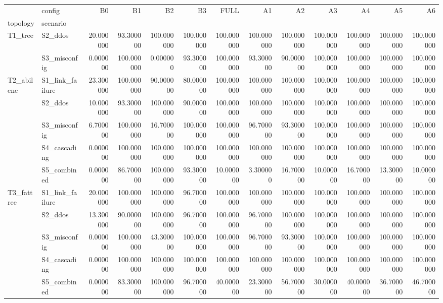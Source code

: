 \begin{tabular}{llrrrrrrrrrrr}
\toprule
 & config & B0 & B1 & B2 & B3 & FULL & A1 & A2 & A3 & A4 & A5 & A6 \\
topology & scenario &  &  &  &  &  &  &  &  &  &  &  \\
\midrule
\multirow[t]{2}{*}{T1_tree} & S2_ddos & 20.000000 & 93.300000 & 100.000000 & 100.000000 & 100.000000 & 100.000000 & 100.000000 & 100.000000 & 100.000000 & 100.000000 & 100.000000 \\
 & S3_misconfig & 0.000000 & 100.000000 & 0.000000 & 93.300000 & 100.000000 & 93.300000 & 90.000000 & 100.000000 & 100.000000 & 100.000000 & 100.000000 \\
\cline{1-13}
\multirow[t]{5}{*}{T2_abilene} & S1_link_failure & 23.300000 & 100.000000 & 90.000000 & 80.000000 & 100.000000 & 100.000000 & 100.000000 & 100.000000 & 100.000000 & 100.000000 & 100.000000 \\
 & S2_ddos & 10.000000 & 93.300000 & 100.000000 & 90.000000 & 100.000000 & 100.000000 & 100.000000 & 100.000000 & 100.000000 & 100.000000 & 100.000000 \\
 & S3_misconfig & 6.700000 & 100.000000 & 16.700000 & 100.000000 & 100.000000 & 96.700000 & 93.300000 & 100.000000 & 100.000000 & 100.000000 & 100.000000 \\
 & S4_cascading & 0.000000 & 100.000000 & 100.000000 & 100.000000 & 100.000000 & 100.000000 & 100.000000 & 100.000000 & 100.000000 & 100.000000 & 100.000000 \\
 & S5_combined & 0.000000 & 86.700000 & 100.000000 & 93.300000 & 10.000000 & 3.300000 & 16.700000 & 10.000000 & 16.700000 & 13.300000 & 10.000000 \\
\cline{1-13}
\multirow[t]{5}{*}{T3_fattree} & S1_link_failure & 20.000000 & 100.000000 & 100.000000 & 96.700000 & 100.000000 & 100.000000 & 100.000000 & 100.000000 & 100.000000 & 100.000000 & 100.000000 \\
 & S2_ddos & 13.300000 & 90.000000 & 100.000000 & 96.700000 & 100.000000 & 96.700000 & 100.000000 & 100.000000 & 100.000000 & 100.000000 & 100.000000 \\
 & S3_misconfig & 0.000000 & 100.000000 & 43.300000 & 100.000000 & 100.000000 & 96.700000 & 93.300000 & 100.000000 & 100.000000 & 100.000000 & 100.000000 \\
 & S4_cascading & 0.000000 & 100.000000 & 100.000000 & 100.000000 & 100.000000 & 100.000000 & 100.000000 & 100.000000 & 100.000000 & 100.000000 & 100.000000 \\
 & S5_combined & 0.000000 & 83.300000 & 100.000000 & 96.700000 & 40.000000 & 23.300000 & 56.700000 & 30.000000 & 40.000000 & 36.700000 & 46.700000 \\
\cline{1-13}
\bottomrule
\end{tabular}
